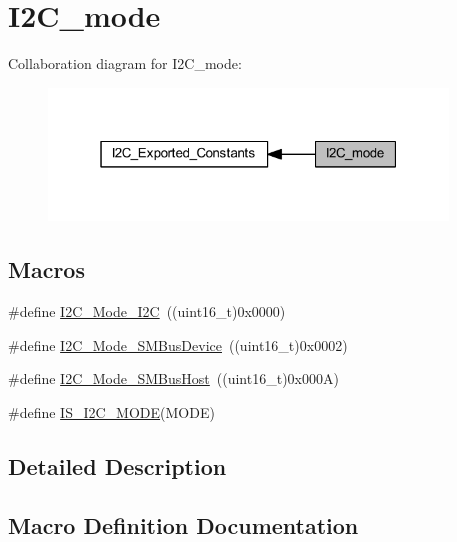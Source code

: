 \hypertarget{group___i2_c__mode}{}\section{I2\+C\+\_\+mode}
\label{group___i2_c__mode}
Collaboration diagram for I2\+C\+\_\+mode\+:
\nopagebreak
\begin{figure}[H]
\begin{center}
\leavevmode
\includegraphics[width=301pt]{group___i2_c__mode}
\end{center}
\end{figure}
\subsection*{Macros}
\begin{DoxyCompactItemize}
\item 
\#define \hyperlink{group___i2_c__mode_ga8bc3b0555ca31b6f8423bc2ada45d1ac}{I2\+C\+\_\+\+Mode\+\_\+\+I2C}~((uint16\+\_\+t)0x0000)
\item 
\#define \hyperlink{group___i2_c__mode_gaf0cf66bc1f4986ba8a9925da924e06da}{I2\+C\+\_\+\+Mode\+\_\+\+S\+M\+Bus\+Device}~((uint16\+\_\+t)0x0002)
\item 
\#define \hyperlink{group___i2_c__mode_gacfd37619c8d91dea5dec2921840acede}{I2\+C\+\_\+\+Mode\+\_\+\+S\+M\+Bus\+Host}~((uint16\+\_\+t)0x000\+A)
\item 
\#define \hyperlink{group___i2_c__mode_ga58464e1fe94a79bab721137a544baf79}{I\+S\+\_\+\+I2\+C\+\_\+\+M\+O\+DE}(M\+O\+DE)
\end{DoxyCompactItemize}


\subsection{Detailed Description}


\subsection{Macro Definition Documentation}
\mbox{\label{group___i2_c__mode_ga8bc3b0555ca31b6f8423bc2ada45d1ac}} 

